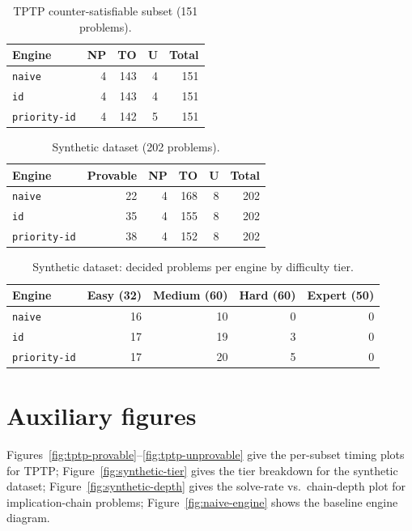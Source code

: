 \documentclass[runningheads]{llncs}
\begin{document}
\begin{table}[h]
  \centering
  \caption{TPTP counter-satisfiable subset (151 problems).}
  \label{tab:tptp-unprovable}
  \begin{tabular}{lrrrr}
    \toprule
    Engine & NP & TO & U & Total \\
    \midrule
    \texttt{naive}       & 4 & 143 & 4 & 151 \\
    \texttt{id}          & 4 & 143 & 4 & 151 \\
    \texttt{priority-id} & 4 & 142 & 5 & 151 \\
    \bottomrule
  \end{tabular}
\end{table}

\begin{table}[h]
  \centering
  \caption{Synthetic dataset (202 problems).}
  \label{tab:ai-gen}
  \begin{tabular}{lrrrrr}
    \toprule
    Engine & Provable & NP & TO & U & Total \\
    \midrule
    \texttt{naive}       & 22 & 4 & 168 & 8 & 202 \\
    \texttt{id}          & 35 & 4 & 155 & 8 & 202 \\
    \texttt{priority-id} & 38 & 4 & 152 & 8 & 202 \\
    \bottomrule
  \end{tabular}
\end{table}


\begin{table}[h]
  \centering
  \caption{Synthetic dataset: decided problems per engine by difficulty tier.}
  \label{tab:synthetic-tier}
  \begin{tabular}{lrrrr}
    \toprule
    Engine & Easy (32) & Medium (60) & Hard (60) & Expert (50) \\
    \midrule
    \texttt{naive}       & 16 & 10 &  0 & 0 \\
    \texttt{id}          & 17 & 19 &  3 & 0 \\
    \texttt{priority-id} & 17 & 20 &  5 & 0 \\
    \bottomrule
  \end{tabular}
\end{table}

\section{Auxiliary figures}\label{app:figures}

Figures~\ref{fig:tptp-provable}--\ref{fig:tptp-unprovable} give the
per-subset timing plots for TPTP; Figure~\ref{fig:synthetic-tier} gives
the tier breakdown for the synthetic dataset;
Figure~\ref{fig:synthetic-depth} gives the solve-rate vs.\ chain-depth
plot for implication-chain problems; Figure~\ref{fig:naive-engine} shows
the baseline engine diagram.
\end{document}
